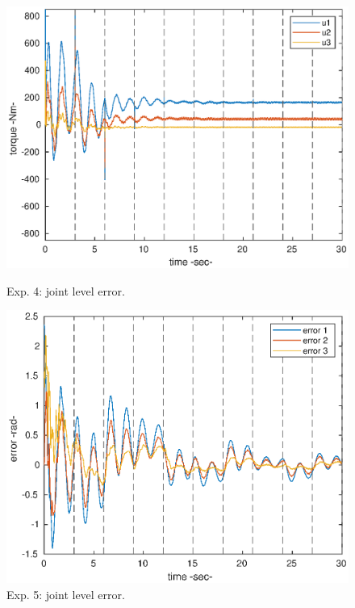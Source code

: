 \begin{center}
\begin{figure}[h!]
\begin{minipage}[h!]{0.45\linewidth}
\includegraphics[scale=0.5]{figures/4_loweffortplot.eps}
\caption{\label{4_u}Exp. 4: joint level error.}
\label{fig:ejexample}
\end{minipage}
\hspace{0.5cm}
\begin{minipage}[h!]{0.45\linewidth}
\includegraphics[scale=0.5]{figures/5_lowerrorplot.eps}
\caption{\label{5_e}Exp. 5: joint level error.}

\end{minipage}
\end{figure}
\end{center}
